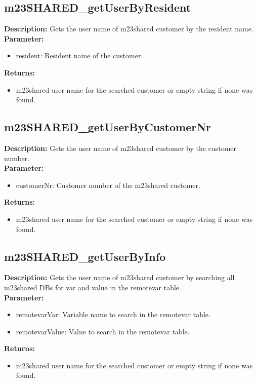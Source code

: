 \subsection{m23SHARED\_getUserByResident}
\textbf{Description:} Gets the user name of m23shared customer by the resident name.\\
\textbf{Parameter:}
\begin{itemize}
\item resident: Resident name of the customer.
\end{itemize}
\textbf{Returns:}
\begin{itemize}
\item m23shared user name for the searched customer or empty string if none was found.
\end{itemize}

\subsection{m23SHARED\_getUserByCustomerNr}
\textbf{Description:} Gets the user name of m23shared customer by the customer number.\\
\textbf{Parameter:}
\begin{itemize}
\item customerNr: Customer number of the m23shared customer.
\end{itemize}
\textbf{Returns:}
\begin{itemize}
\item m23shared user name for the searched customer or empty string if none was found.
\end{itemize}

\subsection{m23SHARED\_getUserByInfo}
\textbf{Description:} Gets the user name of m23shared customer by searching all m23shared DBs for var and value in the remotevar table.\\
\textbf{Parameter:}
\begin{itemize}
\item remotevarVar: Variable name to search in the remotevar table.
\item remotevarValue: Value to search in the remotevar table.
\end{itemize}
\textbf{Returns:}
\begin{itemize}
\item m23shared user name for the searched customer or empty string if none was found.
\end{itemize}

